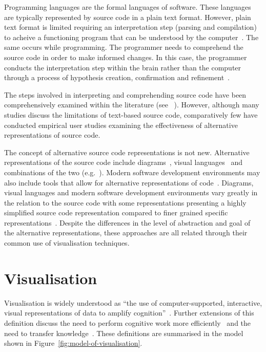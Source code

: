 Programming languages are the formal languages of software. These languages are typically represented by source code in a plain text format. However, plain text format is limited requiring an interpretation step (parsing and compilation) to acheive a functioning program that can be understood by the computer~\cite{Badros2000}. The same occurs while programming. The programmer needs to comprehend the source code in order to make informed changes. In this case, the programmer conducts the interpretation step within the brain rather than the computer through a process of hypothesis creation, confirmation and refinement~\cite{Brooks1983}.

The steps involved in interpreting and comprehending source code have been comprehensively examined within the literature (see ~\cite{Novais2013,McLean2010a,Brooks1995,Desmond,Rajlich2002}). However, although many studies discuss the limitations of text-based source code, comparatively few have conducted empirical user studies examining the effectiveness of alternative representations of source code.

The concept of alternative source code representations is not new. Alternative representations of the source code include diagrams~\cite{Rumbaugh2004}, visual languages~\cite{Cox2007} and combinations of the two (e.g.~\cite{Lucanin2011}). Modern software development environments may also include tools that allow for alternative representations of code~\cite{Cox2007}. Diagrams, visual languages and modern software development environments vary greatly in the relation to the source code with some representations presenting a highly simplified source code representation compared to finer grained specific representations~. Despite the differences in the level of abstraction and goal of the alternative representations, these approaches are all related through their common use of visualisation techniques.

\section{Visualisation}

Visualisation is widely understood as ``the use of computer-supported, interactive, visual representations of data to amplify cognition''~\cite{Card1999}. Further extensions of this definition discuss the need to perform cognitive work more efficiently~\cite{Ware2013a} and the need to transfer knowledge~\cite{Burkhard}. These definitions are summarised in the model shown in Figure~\ref{fig:model-of-visualisation}.

